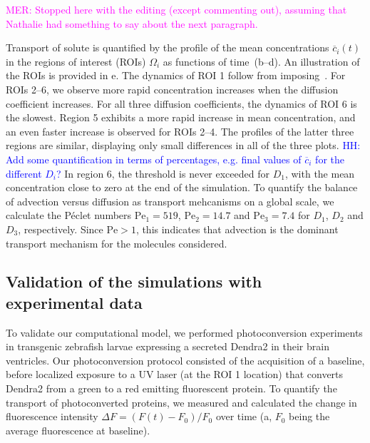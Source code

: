 \documentclass[fleqn]{wlscirep}
\newcommand{\cbar}{\overline{c}}
\newcommand{\lyng}[1]{\textcolor{blue}{#1}}
\newcommand{\mer}[1]{\textcolor{magenta}{#1}}
\begin{document}
\mer{MER: Stopped here with the editing (except commenting out), assuming that Nathalie had something to say about the next paragraph.}

Transport of solute is quantified by the profile of the mean concentrations $\cbar_i(t)$ in the regions of interest (ROIs) $\Omega_i$ as functions of time~(b--d).
An illustration of the ROIs is provided in e. The dynamics of ROI 1 follow from imposing~.
For ROIs 2--6, we observe more rapid concentration increases when the diffusion coefficient increases. 
For all three diffusion coefficients, the dynamics of ROI 6 is the slowest.
Region 5 exhibits a more rapid increase in mean concentration, and an even faster increase is observed for ROIs 2--4.
The profiles of the latter three regions are similar, displaying only small differences in all of the three plots.
\lyng{HH: Add some quantification in terms of percentages, e.g. final values of $\cbar_i$ for the different $D_i$?}
In region 6, the threshold is never exceeded for $D_1$, with the mean concentration close to zero at the end of the simulation. 
To quantify the balance of advection versus diffusion as transport mehcanisms on a global scale, we calculate the Péclet numbers $\mathrm{Pe}_1=519$, $\mathrm{Pe}_2=14.7$ and $\mathrm{Pe}_3=7.4$ for $D_1$, $D_2$ and $D_3$, respectively.
Since $\mathrm{Pe}>1$, this indicates that advection is the dominant transport mechanism for the molecules considered.
 
\subsection*{Validation of the simulations with experimental data}
To validate our computational model, we performed photoconversion experiments in transgenic zebrafish larvae expressing a secreted Dendra2 in their brain ventricles.
Our photoconversion protocol consisted of the acquisition of a baseline, before localized exposure to a UV laser (at the ROI 1 location)
that converts Dendra2 from a green to a red emitting fluorescent protein. 
To quantify the transport of photoconverted proteins, we measured and calculated the change in fluorescence intensity $\Delta F = (F(t)-F_0)/F_0$
over time (a, $F_0$ being the average fluorescence at baseline). 
\end{document}
